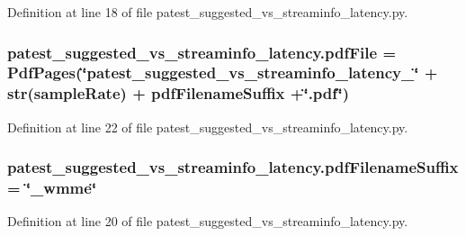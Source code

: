 Definition at line 18 of file patest\+\_\+suggested\+\_\+vs\+\_\+streaminfo\+\_\+latency.\+py.

\subsubsection[{\texorpdfstring{pdf\+File}{pdfFile}}]{\setlength{\rightskip}{0pt plus 5cm}patest\+\_\+suggested\+\_\+vs\+\_\+streaminfo\+\_\+latency.\+pdf\+File = Pdf\+Pages(\char`\"{}patest\+\_\+suggested\+\_\+vs\+\_\+streaminfo\+\_\+latency\+\_\+\char`\"{} + str({\bf sample\+Rate}) + {\bf pdf\+Filename\+Suffix} +\char`\"{}.pdf\char`\"{})}\hypertarget{namespacepatest__suggested__vs__streaminfo__latency_a5c9596f476ca4e898f5a46bc436492c6}{}\label{namespacepatest__suggested__vs__streaminfo__latency_a5c9596f476ca4e898f5a46bc436492c6}


Definition at line 22 of file patest\+\_\+suggested\+\_\+vs\+\_\+streaminfo\+\_\+latency.\+py.

\subsubsection[{\texorpdfstring{pdf\+Filename\+Suffix}{pdfFilenameSuffix}}]{ patest\+\_\+suggested\+\_\+vs\+\_\+streaminfo\+\_\+latency.\+pdf\+Filename\+Suffix = \char`\"{}\+\_\+wmme\char`\"{}}\hypertarget{namespacepatest__suggested__vs__streaminfo__latency_ad2878f6ec171540823ed101d29d1d8a5}{}\label{namespacepatest__suggested__vs__streaminfo__latency_ad2878f6ec171540823ed101d29d1d8a5}


Definition at line 20 of file patest\+\_\+suggested\+\_\+vs\+\_\+streaminfo\+\_\+latency.\+py.

